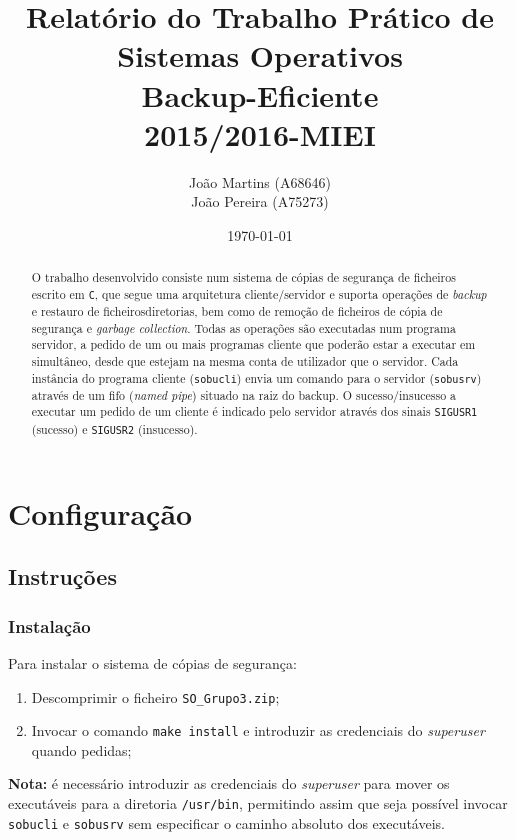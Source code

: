 \documentclass[a4paper,12pt,titlepage,draft,portuguese]{article}
\title{Relatório do Trabalho Prático de Sistemas Operativos\\[1cm]\large{\textbf{Backup-Eficiente}}\\\large{2015/2016-MIEI}}
\author{João Martins (A68646) \\João Pereira (A75273)}
\date{\today}
\begin{document}
\maketitle

\begin{abstract}
O trabalho desenvolvido consiste num sistema de cópias de segurança de ficheiros escrito em \texttt{C}, que segue uma arquitetura cliente/servidor e suporta operações de \emph{backup} e restauro de ficheiros\/diretorias, bem como de remoção de ficheiros de cópia de segurança e \emph{garbage collection}. Todas as operações são executadas num programa servidor, a pedido de um ou mais programas cliente que poderão estar a executar em simultâneo, desde que estejam na mesma conta de utilizador que o servidor. Cada instância do programa cliente (\texttt{sobucli}) envia um comando para o servidor (\texttt{sobusrv}) através de um fifo (\emph{named pipe}) situado na raiz do backup. O sucesso/insucesso a executar um pedido de um cliente é indicado pelo servidor através dos sinais \texttt{SIGUSR1} (sucesso) e \texttt{SIGUSR2} (insucesso).

\end{abstract}

\tableofcontents

\newpage


\section{Configuração}

\subsection{Instruções}

\subsubsection{Instalação}

Para instalar o sistema de cópias de segurança:
	\begin{enumerate}
		\item Descomprimir o ficheiro \texttt{SO\_Grupo3.zip};
		\item Invocar o comando \texttt{make install} e introduzir as credenciais do \emph{superuser} quando pedidas;
	\end{enumerate}
\textbf{Nota:} é necessário introduzir as credenciais do \emph{superuser} para mover os executáveis para a diretoria \texttt{/usr/bin}, permitindo assim que seja possível invocar \texttt{sobucli} e \texttt{sobusrv} sem especificar o caminho absoluto dos executáveis.
\end{document}
